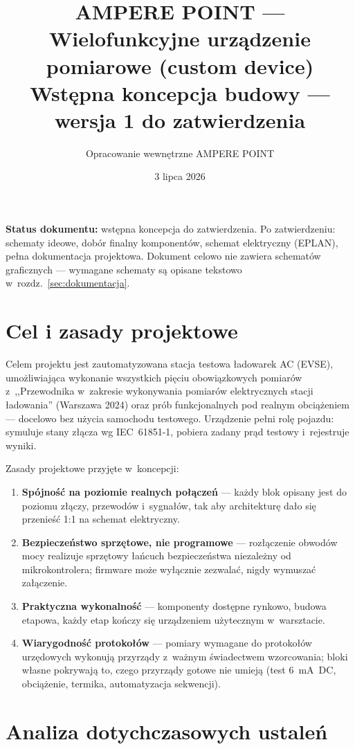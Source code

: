 \documentclass[11pt,a4paper]{article}
\title{\textbf{AMPERE POINT --- Wielofunkcyjne urządzenie pomiarowe (custom device)}\\[4pt]
\large Wstępna koncepcja budowy --- wersja 1 do zatwierdzenia}
\author{Opracowanie wewnętrzne AMPERE POINT}
\date{3 lipca 2026}
\begin{document}
\maketitle
\vspace{-1.5em}

\noindent\textbf{Status dokumentu:} wstępna koncepcja do zatwierdzenia. Po zatwierdzeniu: schematy ideowe, dobór finalny komponentów, schemat elektryczny (EPLAN), pełna dokumentacja projektowa. Dokument celowo nie zawiera schematów graficznych --- wymagane schematy są opisane tekstowo w~rozdz.~\ref{sec:dokumentacja}.

\tableofcontents

\section{Cel i zasady projektowe}
\label{sec:cel}

Celem projektu jest zautomatyzowana stacja testowa ładowarek AC (EVSE), umożliwiająca wykonanie wszystkich pięciu obowiązkowych pomiarów z~,,Przewodnika w~zakresie wykonywania pomiarów elektrycznych stacji ładowania'' (Warszawa 2024) oraz prób funkcjonalnych pod realnym obciążeniem --- docelowo bez użycia samochodu testowego. Urządzenie pełni rolę pojazdu: symuluje stany złącza wg IEC~61851-1, pobiera zadany prąd testowy i~rejestruje wyniki.

Zasady projektowe przyjęte w~koncepcji:
\begin{enumerate}
\item \textbf{Spójność na poziomie realnych połączeń} --- każdy blok opisany jest do poziomu złączy, przewodów i~sygnałów, tak aby architekturę dało się przenieść 1:1 na schemat elektryczny.
\item \textbf{Bezpieczeństwo sprzętowe, nie programowe} --- rozłączenie obwodów mocy realizuje sprzętowy łańcuch bezpieczeństwa niezależny od mikrokontrolera; firmware może wyłącznie zezwalać, nigdy wymuszać załączenie.
\item \textbf{Praktyczna wykonalność} --- komponenty dostępne rynkowo, budowa etapowa, każdy etap kończy się urządzeniem użytecznym w~warsztacie.
\item \textbf{Wiarygodność protokołów} --- pomiary wymagane do protokołów urzędowych wykonują przyrządy z~ważnym świadectwem wzorcowania; bloki własne pokrywają to, czego przyrządy gotowe nie umieją (test 6~mA~DC, obciążenie, termika, automatyzacja sekwencji).
\end{enumerate}

\section{Analiza dotychczasowych ustaleń}
\label{sec:analiza}
\end{document}
